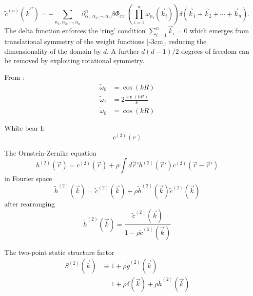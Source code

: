 \documentclass[12pt]{report}
\begin{document}
\begin{equation}
  \tilde{c}^{(n)}(\vec{k}^n) =
  - \sum_{\alpha_1, \alpha_2, \cdots, \alpha_n}
  \partial^n_{\alpha_1, \alpha_2, \cdots, \alpha_n} \beta\Phi_{ex} \;
  \left( \prod_{i=1}^n \widetilde{\omega}_{\alpha_i}(\vec{k}_i) \right)
  \delta(\vec{k}_1 + \vec{k}_2 + \cdots + \vec{k}_n).
\end{equation}
The delta function enforces the `ring' condition $\sum_{i=1}^n \vec{k}_i = 0$ which emerges from translational symmetry of the weight functions%
[-3cm],
reducing the dimensionality of the domain by $d$.
A further $d(d-1)/2$ degrees of freedom%
can be removed by exploiting rotational symmetry.

From \cite{Rosenfeld1990}:
\begin{align}
  \widetilde{\omega}_0 &= \cos{(kR)} \\
  \widetilde{\omega}_1 &= 2\frac{\sin{(kR)}}{k} \\
  \widetilde{\omega}_0 &= \cos{(kR)}
\end{align}

White bear I:
\begin{equation}
  c^{(2)}(r)
\end{equation}

The Ornstein-Zernike equation
\begin{equation}
  h^{(2)}(\vec{r}) =
  c^{(2)}(\vec{r}) +
  \rho \int d\vec{r}' h^{(2)}(\vec{r}') c^{(2)}(\vec{r} - \vec{r}')
\end{equation}
in Fourier space
\begin{equation*}
  \tilde{h}^{(2)}(\vec{k}) =
  \tilde{c}^{(2)}(\vec{k}) +
  \rho \tilde{h}^{(2)}(\vec{k}) \tilde{c}^{(2)}(\vec{k})
\end{equation*}
after rearranging
\begin{equation}
  \tilde{h}^{(2)}(\vec{k}) =
  \frac{\tilde{c}^{(2)}(\vec{k})}{1 - \rho \tilde{c}^{(2)}(\vec{k})}
\end{equation}

The two-point static structure factor
\begin{equation}
  \begin{aligned}
    S^{(2)}(\vec{k}) &\equiv 1 + \rho \tilde{g}^{(2)}(\vec{k}) \\
    &= 1 + \rho \delta(\vec{k}) + \rho \tilde{h}^{(2)}(\vec{k})
  \end{aligned}
\end{equation}
\end{document}
